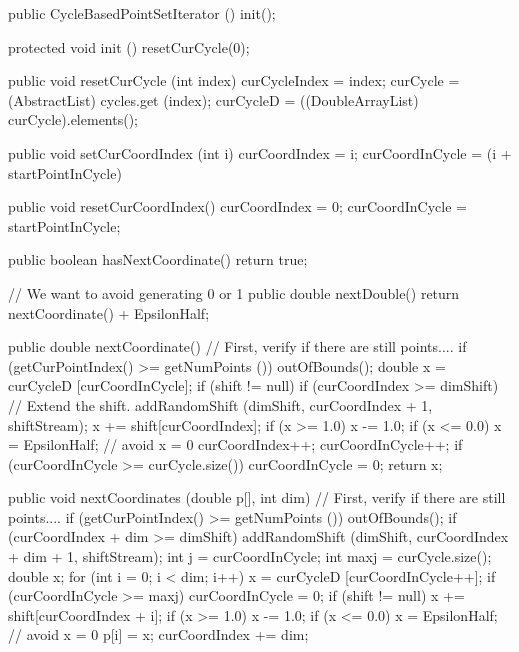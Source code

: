\begin{code}
\begin{hide}
{      public CycleBasedPointSetIterator () {
         init();
      }

      protected void init () {
         resetCurCycle(0);
      }

      public void resetCurCycle (int index) {
         curCycleIndex = index;
         curCycle = (AbstractList) cycles.get (index);
         curCycleD = ((DoubleArrayList) curCycle).elements();
      }

      public void setCurCoordIndex (int i) {
         curCoordIndex = i;
         curCoordInCycle = (i + startPointInCycle) %
      }

      public void resetCurCoordIndex() {
         curCoordIndex = 0;
         curCoordInCycle = startPointInCycle;
      }

      public boolean hasNextCoordinate() {
         return true;
      }

      // We want to avoid generating 0 or 1
      public double nextDouble() {
         return nextCoordinate() + EpsilonHalf;
      }

      public double nextCoordinate() {
         // First, verify if there are still points....
         if (getCurPointIndex() >= getNumPoints ())
            outOfBounds();
         double x = curCycleD [curCoordInCycle];
         if (shift != null) {
             if (curCoordIndex >= dimShift)   // Extend the shift.
                addRandomShift (dimShift, curCoordIndex + 1, shiftStream);
             x += shift[curCoordIndex];
             if (x >= 1.0)
                x -= 1.0;
             if (x <= 0.0)
                x = EpsilonHalf;  // avoid x = 0
         }
         curCoordIndex++;
         curCoordInCycle++;
         if (curCoordInCycle >= curCycle.size())
            curCoordInCycle = 0;
         return x;
      }

      public void nextCoordinates (double p[], int dim) {
         // First, verify if there are still points....
         if (getCurPointIndex() >= getNumPoints ())
            outOfBounds();
         if (curCoordIndex + dim >= dimShift)
            addRandomShift (dimShift, curCoordIndex + dim + 1, shiftStream);
         int j = curCoordInCycle;
         int maxj = curCycle.size();
         double x;
         for (int i = 0; i < dim; i++) {
            x = curCycleD [curCoordInCycle++];
            if (curCoordInCycle >= maxj) curCoordInCycle = 0;
            if (shift != null) {
               x += shift[curCoordIndex + i];
               if (x >= 1.0)
                  x -= 1.0;
               if (x <= 0.0)
                  x = EpsilonHalf;  // avoid x = 0
           }
            p[i] = x;
         }
         curCoordIndex += dim;
      }

}
\end{hide}
\end{code}
